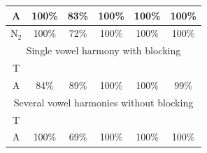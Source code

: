 \documentclass[11pt]{article}
\newcommand{\cmark}{\ding{51}}%
\newcommand{\xmark}{\ding{55}}%
\begin{document}
\begin{table}[t!]
{\begin{tabular}{|cccccc|}
\multicolumn{1}{|c|}{A}                  & \multicolumn{1}{c|}{\cellcolor[HTML]{548235}100\%} & \multicolumn{1}{c|}{\cellcolor[HTML]{F8CBAD}83\%}  & \multicolumn{1}{c|}{\cellcolor[HTML]{548235}100\%} & \multicolumn{1}{c|}{\cellcolor[HTML]{548235}100\%} & \cellcolor[HTML]{548235}100\% \\ \hline
\multicolumn{1}{|c|}{N$_2$}                  & \multicolumn{1}{c|}{\cellcolor[HTML]{548235}100\%} & \multicolumn{1}{c|}{\cellcolor[HTML]{F8CBAD}72\%}  & \multicolumn{1}{c|}{\cellcolor[HTML]{548235}100\%} & \multicolumn{1}{c|}{\cellcolor[HTML]{548235}100\%} & \cellcolor[HTML]{548235}100\% \\ \hline
\multicolumn{6}{|c|}{Single vowel harmony with blocking}                                                                                                                                                                                                                                     \\ \hline
\multicolumn{1}{|c|}{T}                  & \multicolumn{1}{c|}{{\color[HTML]{FE0000} \xmark}} & \multicolumn{1}{c|}{{\color[HTML]{FE0000} \xmark}} & \multicolumn{1}{c|}{{\color[HTML]{548235} \cmark}} & \multicolumn{1}{c|}{{\color[HTML]{548235} \cmark}} & {\color[HTML]{548235} \cmark} \\ \hline
\multicolumn{1}{|c|}{A}                  & \multicolumn{1}{c|}{\cellcolor[HTML]{F8CBAD}84\%}  & \multicolumn{1}{c|}{\cellcolor[HTML]{F8CBAD}89\%}  & \multicolumn{1}{c|}{\cellcolor[HTML]{548235}100\%} & \multicolumn{1}{c|}{\cellcolor[HTML]{548235}100\%} & \cellcolor[HTML]{C6E0B4}99\%  \\ \hline
\multicolumn{6}{|c|}{Several vowel harmonies without blocking}                                                                                                                                                                                                                               \\ \hline
\multicolumn{1}{|c|}{T}                  & \multicolumn{1}{c|}{{\color[HTML]{548235} \cmark}} & \multicolumn{1}{c|}{{\color[HTML]{FE0000} \xmark}} & \multicolumn{1}{c|}{{\color[HTML]{548235} \cmark}} & \multicolumn{1}{c|}{{\color[HTML]{548235} \cmark}} & {\color[HTML]{548235} \cmark} \\ \hline
\multicolumn{1}{|c|}{A}                  & \multicolumn{1}{c|}{\cellcolor[HTML]{548235}100\%} & \multicolumn{1}{c|}{\cellcolor[HTML]{F8CBAD}69\%}  & \multicolumn{1}{c|}{\cellcolor[HTML]{548235}100\%} & \multicolumn{1}{c|}{\cellcolor[HTML]{548235}100\%} & \cellcolor[HTML]{548235}100\% \\ \hline

\end{tabular}}
\end{table}
\end{document}
